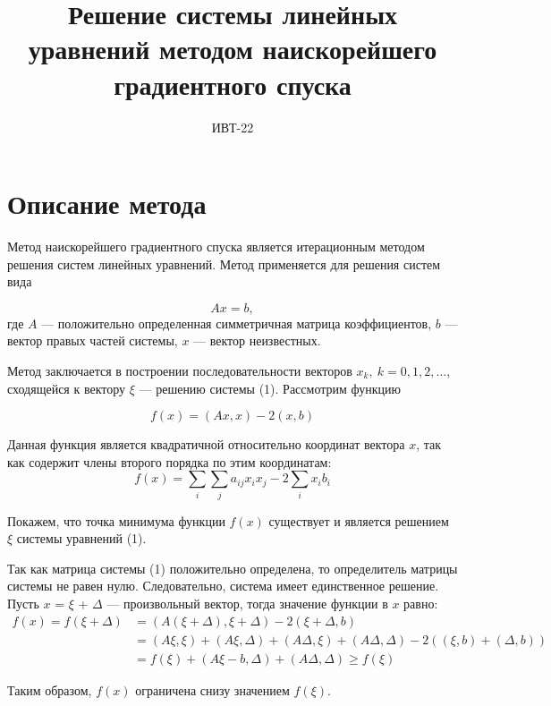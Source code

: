 \documentclass{article}
\title{Решение системы линейных уравнений методом наискорейшего градиентного спуска}
\author{ИВТ-22}
\begin{document}
\maketitle

\section{Описание метода}

  
Метод наискорейшего градиентного спуска является итерационным методом решения систем линейных уравнений.
Метод применяется для решения систем вида 

\begin{equation}
    Ax = b,
\end{equation}
где $A$ --- положительно определенная симметричная матрица коэффициентов, $b$ --- вектор правых частей 
системы, $x$ --- вектор неизвестных.  


Метод заключается в построении последовательности векторов ${x_k}, \ k = 0, 1, 2, \dots$, сходящейся к
вектору $\xi$ --- решению системы (1). Рассмотрим функцию 

\begin{equation}
    f(x) = (Ax, x) - 2 (x, b)
\end{equation}  

Данная функция является квадратичной относительно координат вектора $x$, так как содержит 
члены второго порядка по этим координатам:
\begin{equation*}
    f(x) = \sum_{i} \sum_j a_{ij} x_i x_j - 2 \sum_i x_i b_i
\end{equation*}  


Покажем, что точка минимума функции $f(x)$ существует и является решением $\xi$ системы уравнений (1).  


Так как матрица системы (1) положительно определена, то определитель матрицы системы не равен нулю. Следовательно, система имеет единственное решение. Пусть $x$ = $\xi$ + $\Delta$ --- произвольный вектор,
тогда значение функции в $x$ равно:
\begin{align*}
    f(x) = f(\xi + \Delta) &= (A(\xi + \Delta), \xi + \Delta) - 2(\xi + \Delta, b) \\
    &= (A \xi, \xi) + (A \xi, \Delta) + (A \Delta, \xi) + (A \Delta, \Delta) - 
    2((\xi, b) + (\Delta, b)) \\
    &= f(\xi) + (A \xi - b, \Delta) + (A \Delta, \Delta) \geq f(\xi)
\end{align*}

Таким образом, $f(x)$ ограничена снизу значением $f(\xi)$. 
\end{document}
